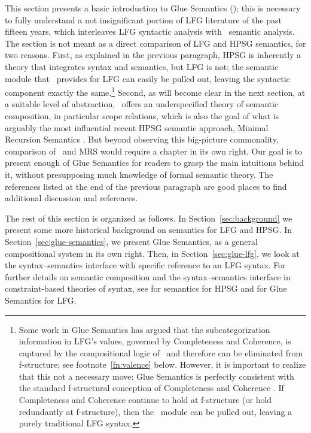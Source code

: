 This section presents a basic introduction to Glue Semantics (\glue); this is necessary to fully understand a not insignificant portion of LFG literature of the past fifteen years, which interleaves LFG syntactic analysis with \glue\ semantic analysis. The section is not meant as a direct comparison of LFG and HPSG semantics, for two reasons. First, as explained in the previous paragraph, HPSG is inherently a theory that integrates syntax and semantics, but LFG is not; the semantic module that \glue\ provides for LFG can easily be pulled out, leaving the syntactic component exactly the same.\footnote{Some work in Glue Semantics has argued that the subcategorization information in LFG's  values, governed by Completeness and Coherence, is captured by the compositional logic of \glue\ and therefore can be eliminated from f-structure; see footnote~\ref{fn:valence} below.  However, it is important to realize that this not a necessary move: Glue Semantics is perfectly consistent with the standard f-structural conception of Completeness and Coherence \citep[see, e.g., the discussion of syntactic versus semantic Completeness and Coherence in][53--56, 315--317]{dalrymple;ea19}. If Completeness and Coherence continue to hold at f-structure (or hold redundantly at f-structure), then the \glue\ module can be pulled out, leaving a purely traditional LFG syntax.} Second, as will become clear in the next section, at a suitable level of abstraction, \glue\ offers an underspecified theory of semantic composition, in particular scope relations, which is also the goal of what is arguably the most influential recent HPSG semantic approach, Minimal Recursion Semantics \citep{copestake;ea05}. But beyond observing this big-picture commonality, comparison of \glue\ and MRS would require a chapter in its own right.
Our goal is to present enough of Glue Semantics for readers to grasp the main intuitions behind it, without presupposing much knowledge of formal semantic theory.  The references listed at the end of the previous paragraph \citep[especially][]{dalrymple;ea19} are good places to find additional discussion and references.

The rest of this section is organized as follows. In Section~\ref{sec:background} we present some more historical background on semantics for LFG and HPSG.  In Section~\ref{sec:glue-semantics}, we present Glue Semantics, as a general compositional system in its own right. Then, in Section~\ref{sec:glue-lfg}, we look at the syntax--semantics interface with specific reference to an LFG syntax. For further details on semantic composition and the syntax--semantics interface in constraint-based theories of syntax, see  for semantics for HPSG and \citet{asudeh-lfg-glue} for Glue Semantics for LFG.

